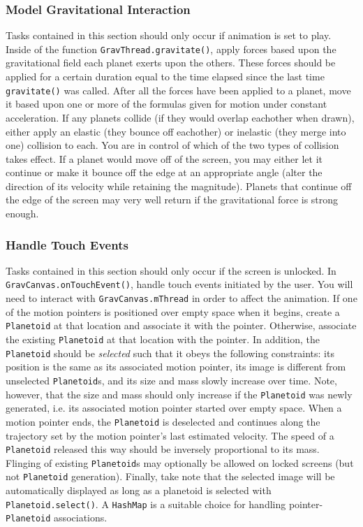 \subsubsection{Model Gravitational Interaction}
Tasks contained in this section should only occur if animation is set to play.
Inside of the function \verb=GravThread.gravitate()=, apply forces based upon the gravitational field each planet exerts upon the others.
These forces should be applied for a certain duration equal to the time elapsed since the last time \verb=gravitate()= was called.
After all the forces have been applied to a planet, move it based upon one or more of the formulas given for motion under constant acceleration.
If any planets collide (if they would overlap eachother when drawn), either apply an elastic (they bounce off eachother) or inelastic (they merge into one) collision to each.
You are in control of which of the two types of collision takes effect.
If a planet would move off of the screen, you may either let it continue or make it bounce off the edge at an appropriate angle (alter the direction of its velocity while retaining the magnitude).
Planets that continue off the edge of the screen may very well return if the gravitational force is strong enough.

\subsubsection{Handle Touch Events}
Tasks contained in this section should only occur if the screen is unlocked.
In \verb=GravCanvas.onTouchEvent()=, handle touch events initiated by the user.
You will need to interact with \verb=GravCanvas.mThread= in order to affect the animation.
If one of the motion pointers is positioned over empty space when it begins, create a \verb=Planetoid= at that location and associate it with the pointer.
Otherwise, associate the existing \verb=Planetoid= at that location with the pointer.
In addition, the \verb=Planetoid= should be {\em selected} such that it obeys the following constraints: its position is the same as its associated motion pointer, its image is different from unselected \verb=Planetoid=s, and its size and mass slowly increase over time.
Note, however, that the size and mass should only increase if the \verb=Planetoid= was newly generated, i.e. its associated motion pointer started over empty space.
When a motion pointer ends, the \verb=Planetoid= is deselected and continues along the trajectory set by the motion pointer's last estimated velocity. 
The speed of a \verb=Planetoid= released this way should be inversely proportional to its mass.
Flinging of existing \verb=Planetoid=s  may optionally be allowed on locked screens (but not \verb=Planetoid= generation).
Finally, take note that the selected image will be automatically displayed as long as a planetoid is selected with \verb=Planetoid.select()=.
A \verb=HashMap= is a suitable choice for handling pointer-\verb=Planetoid= associations.

